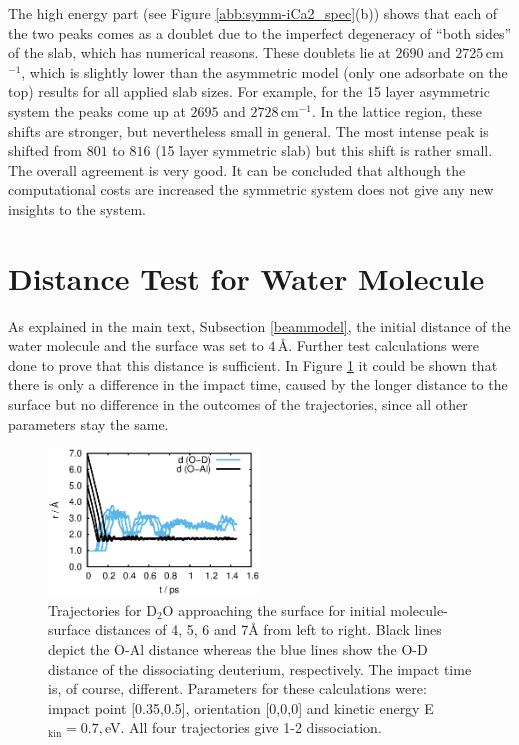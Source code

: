 \documentclass[11pt,DIV=13,BCOR=5mm,a4paper,headinclude]{scrbook}
\begin{document}
The high energy part (see Figure \ref{abb:symm-iCa2_spec}(b)) shows that each of the two peaks comes as a doublet due to the imperfect degeneracy of ``both sides'' of the slab, which has numerical reasons.
These doublets lie at $2690$ and $2725\,$cm$^{-1}$, which is slightly lower than the asymmetric model (only one adsorbate on the top) results for all applied slab sizes.
For example, for the 15 layer asymmetric system the peaks come up at $2695$ and $2728\,$cm$^{-1}$.
In the lattice region, these shifts are stronger, but nevertheless small in general.
The most intense peak is shifted from $801$ to $816$ (15 layer symmetric slab) but this shift is rather small.
The overall agreement is very good.
It can be concluded that although the computational costs are increased the symmetric system does not give any new insights to the system.
\\
\def\thefigure{C.\arabic{figure}}
\def\thetable{C.\arabic{table}}
\section{Distance Test for Water Molecule}\label{sec:disttest}
As explained in the main text, Subsection \ref{beammodel}, the initial distance of the water molecule and the surface was set to $4\,$\AA{}.
Further test calculations were done to prove that this distance is sufficient.
In Figure \ref{abb:MBS-dist} it could be shown that there is only a difference in the impact time, caused by the longer distance to the surface but no difference in the outcomes of the trajectories, since all other parameters stay the same.
 \begin{figure}[!h]
    \centering
    \includegraphics[width=0.5\textwidth]{figures/11-20/MD_all.eps}
  \caption{Trajectories for D$_2$O approaching the surface for initial molecule-surface distances of 4, 5, 6 and 7\AA{} from left to right.
Black lines depict the O-Al distance whereas the blue lines show the O-D distance of the dissociating deuterium, respectively.
The impact time is, of course, different.
Parameters for these calculations were: impact point [0.35,0.5], orientation [0,0,0] and kinetic energy E$_\textrm{kin}=0.7,$eV.
All four trajectories give 1-2 dissociation.}
  \label{abb:MBS-dist}
 \end{figure}
\\
\def\thefigure{D.\arabic{figure}}
\def\thetable{D.\arabic{table}}
\end{document}
